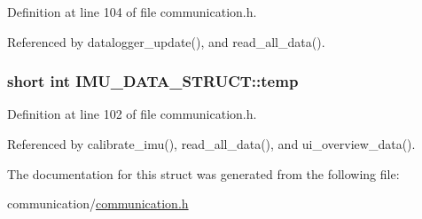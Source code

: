 Definition at line 104 of file communication.h.



Referenced by datalogger\_\-update(), and read\_\-all\_\-data().

\hypertarget{structIMU__DATA__STRUCT_a81e1dbf765c1d947ca6076aa1bbc73e7}{
\subsubsection[{temp}]{\setlength{\rightskip}{0pt plus 5cm}short int {\bf IMU\_\-DATA\_\-STRUCT::temp}}}
\label{structIMU__DATA__STRUCT_a81e1dbf765c1d947ca6076aa1bbc73e7}


Definition at line 102 of file communication.h.



Referenced by calibrate\_\-imu(), read\_\-all\_\-data(), and ui\_\-overview\_\-data().



The documentation for this struct was generated from the following file:\begin{DoxyCompactItemize}
\item 
communication/\hyperlink{communication_8h}{communication.h}\end{DoxyCompactItemize}
